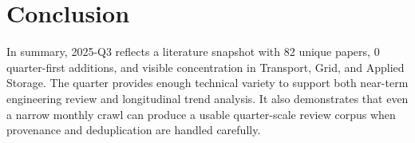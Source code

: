 \documentclass[conference]{IEEEtran}
\begin{document}
\section{Conclusion}
In summary, 2025-Q3 reflects a literature snapshot with 82 unique papers, 0 quarter-first additions, and visible concentration in Transport, Grid, and Applied Storage. The quarter provides enough technical variety to support both near-term engineering review and longitudinal trend analysis. It also demonstrates that even a narrow monthly crawl can produce a usable quarter-scale review corpus when provenance and deduplication are handled carefully.



\end{document}
